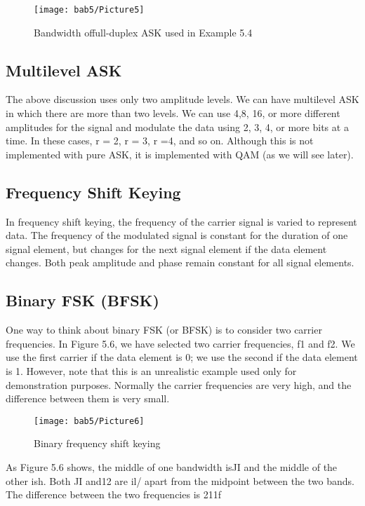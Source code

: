 \begin{figure}[htbp]
  \centering
  \texttt{[image: bab5/Picture5]}
  \caption{Bandwidth offull-duplex ASK used in Example 5.4}
  \label{fig5:5}
\end{figure}

\subsection*{Multilevel ASK}
The above discussion uses only two amplitude levels. We can have multilevel ASK in which there are more than two levels. We can use 4,8, 16, or more different amplitudes for the signal and modulate the data using 2, 3, 4, or more bits at a time. In these cases, r = 2, r = 3, r =4, and so on. Although this is not implemented with pure ASK, it is implemented with QAM (as we will see later).

\subsection{Frequency Shift Keying}
In frequency shift keying, the frequency of the carrier signal is varied to represent data. The frequency of the modulated signal is constant for the duration of one signal element, but changes for the next signal element if the data element changes. Both peak amplitude and phase remain constant for all signal elements.

\subsection*{Binary FSK (BFSK)}
One way to think about binary FSK (or BFSK) is to consider two carrier frequencies. In Figure 5.6, we have selected two carrier frequencies, f1 and f2. We use the first carrier if the data element is 0; we use the second if the data element is 1. However, note that this is an unrealistic example used only for demonstration purposes. Normally the carrier frequencies are very high, and the difference between them is very small.

\begin{figure}[htbp]
  \centering
  \texttt{[image: bab5/Picture6]}
  \caption{Binary frequency shift keying}
  \label{fig5:6}
\end{figure}

As Figure 5.6 shows, the middle of one bandwidth isJI and the middle of the other ish. Both JI and12 are il/ apart from the midpoint between the two bands. The difference between the two frequencies is 211f

